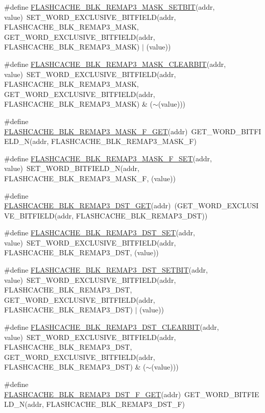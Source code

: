 \begin{DoxyCompactItemize}
\item 
\#define \hyperlink{a00549_ac828bf1e926af961fddc27413bec886e}{FLASHCACHE\_\-BLK\_\-REMAP3\_\-MASK\_\-SETBIT}(addr, value)~SET\_\-WORD\_\-EXCLUSIVE\_\-BITFIELD(addr, FLASHCACHE\_\-BLK\_\-REMAP3\_\-MASK, GET\_\-WORD\_\-EXCLUSIVE\_\-BITFIELD(addr, FLASHCACHE\_\-BLK\_\-REMAP3\_\-MASK) $|$ (value))
\item 
\#define \hyperlink{a00549_a37bf1f9bf0c88271a372d01c55139071}{FLASHCACHE\_\-BLK\_\-REMAP3\_\-MASK\_\-CLEARBIT}(addr, value)~SET\_\-WORD\_\-EXCLUSIVE\_\-BITFIELD(addr, FLASHCACHE\_\-BLK\_\-REMAP3\_\-MASK, GET\_\-WORD\_\-EXCLUSIVE\_\-BITFIELD(addr, FLASHCACHE\_\-BLK\_\-REMAP3\_\-MASK) \& ($\sim$(value)))
\item 
\#define \hyperlink{a00549_abcf8c17f7f4bad0a4442ba6431c9e7e1}{FLASHCACHE\_\-BLK\_\-REMAP3\_\-MASK\_\-F\_\-GET}(addr)~GET\_\-WORD\_\-BITFIELD\_\-N(addr, FLASHCACHE\_\-BLK\_\-REMAP3\_\-MASK\_\-F)
\item 
\#define \hyperlink{a00549_adb6ec1801755831a1af2a3027ae3a4a0}{FLASHCACHE\_\-BLK\_\-REMAP3\_\-MASK\_\-F\_\-SET}(addr, value)~SET\_\-WORD\_\-BITFIELD\_\-N(addr, FLASHCACHE\_\-BLK\_\-REMAP3\_\-MASK\_\-F, (value))
\item 
\#define \hyperlink{a00549_adbb967593df41f31f66c24892fd37851}{FLASHCACHE\_\-BLK\_\-REMAP3\_\-DST\_\-GET}(addr)~(GET\_\-WORD\_\-EXCLUSIVE\_\-BITFIELD(addr, FLASHCACHE\_\-BLK\_\-REMAP3\_\-DST))
\item 
\#define \hyperlink{a00549_a0cfa283fa1beacac6dae17af647774c6}{FLASHCACHE\_\-BLK\_\-REMAP3\_\-DST\_\-SET}(addr, value)~SET\_\-WORD\_\-EXCLUSIVE\_\-BITFIELD(addr, FLASHCACHE\_\-BLK\_\-REMAP3\_\-DST, (value))
\item 
\#define \hyperlink{a00549_a74bbf736f9e7353afccc08b76b0ebf83}{FLASHCACHE\_\-BLK\_\-REMAP3\_\-DST\_\-SETBIT}(addr, value)~SET\_\-WORD\_\-EXCLUSIVE\_\-BITFIELD(addr, FLASHCACHE\_\-BLK\_\-REMAP3\_\-DST, GET\_\-WORD\_\-EXCLUSIVE\_\-BITFIELD(addr, FLASHCACHE\_\-BLK\_\-REMAP3\_\-DST) $|$ (value))
\item 
\#define \hyperlink{a00549_a1d47bf720f9df18c8d007cd8915596b5}{FLASHCACHE\_\-BLK\_\-REMAP3\_\-DST\_\-CLEARBIT}(addr, value)~SET\_\-WORD\_\-EXCLUSIVE\_\-BITFIELD(addr, FLASHCACHE\_\-BLK\_\-REMAP3\_\-DST, GET\_\-WORD\_\-EXCLUSIVE\_\-BITFIELD(addr, FLASHCACHE\_\-BLK\_\-REMAP3\_\-DST) \& ($\sim$(value)))
\item 
\#define \hyperlink{a00549_a5b070636619484b95afe29d6e299669c}{FLASHCACHE\_\-BLK\_\-REMAP3\_\-DST\_\-F\_\-GET}(addr)~GET\_\-WORD\_\-BITFIELD\_\-N(addr, FLASHCACHE\_\-BLK\_\-REMAP3\_\-DST\_\-F)

\end{DoxyCompactItemize}
